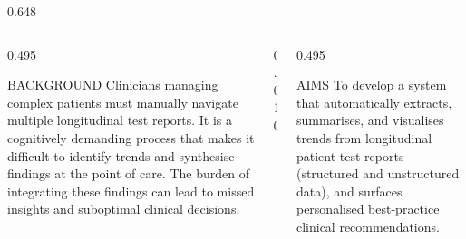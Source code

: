 \documentclass[final]{beamer}
\begin{document}
\begin{frame}[t]{}

%
%
%

\begin{columns}[T, totalwidth=\textwidth]

  \begin{column}{0.648\textwidth}

    \begin{columns}[T, totalwidth=\linewidth]

      \begin{column}{0.495\linewidth}
        \begin{block}{BACKGROUND}
          Clinicians managing complex patients must manually navigate multiple
          longitudinal test reports. It is a cognitively demanding process
          that makes it difficult to identify trends and synthesise findings
          at the point of care. The burden of integrating these findings can
          lead to missed insights and suboptimal clinical decisions.
        \end{block}
      \end{column}

      \begin{column}{0.010\linewidth}\end{column}

      \begin{column}{0.495\linewidth}
        \begin{block}{AIMS}
          To develop a system that automatically extracts, summarises, and
          visualises trends from longitudinal patient test reports (structured
          and unstructured data), and surfaces personalised best-practice
          clinical recommendations.
        \end{block}
      \end{column}


\end{columns}
\end{column}
\end{columns}
\end{frame}
\end{document}
